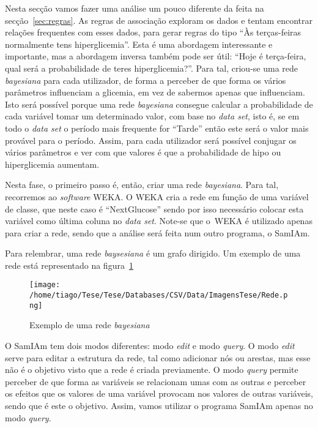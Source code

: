 Nesta secção vamos fazer uma análise um pouco diferente da feita na secção~\ref{sec:regras}. As regras de associação exploram os dados e tentam encontrar relações frequentes com esses dados, para gerar regras do tipo ``Às terças-feiras normalmente tens hiperglicemia''. Esta é uma abordagem interessante e importante, mas a abordagem inversa também pode ser útil: ``Hoje é terça-feira, qual será a probabilidade de teres hiperglicemia?''. Para tal, criou-se uma rede \textit{bayesiana} para cada utilizador, de forma a perceber de que forma os vários parâmetros influenciam a glicemia, em vez de sabermos apenas que influenciam. Isto será possível porque uma rede \textit{bayesiana} consegue calcular a probabilidade de cada variável tomar um determinado valor, com base no \textit{data set}, isto é, se em todo o \textit{data set} o período mais frequente for ``Tarde'' então este será o valor mais provável para o período. 
Assim, para cada utilizador será possível conjugar os vários parâmetros e ver com que valores é que a probabilidade de hipo ou hiperglicemia aumentam.

Nesta fase, o primeiro passo é, então, criar uma rede \textit{bayesiana}. Para tal, recorremos ao \textit{software} \ac{WEKA}. O \ac{WEKA} cria a rede em função de uma variável de classe, que neste caso é ``Next\textunderscore Glucose'' sendo por isso necessário colocar esta variável como última coluna no \textit{data set}. Note-se que o~\ac{WEKA} é utilizado apenas para criar a rede, sendo que a análise será feita num outro programa, o \ac{SamIAm}.

Para relembrar, uma rede \textit{baysesiana} é um grafo dirigido. Um exemplo de uma rede está representado na figura~\ref{fig:rede}
\begin{figure}[H]
\centering
\texttt{[image: /home/tiago/Tese/Tese/Databases/CSV/Data/ImagensTese/Rede.png]}
\caption{Exemplo de uma rede \textit{bayesiana}}
\label{fig:rede}
\end{figure}

O \ac{SamIAm} tem dois modos diferentes: modo \textit{edit} e modo \textit{query}. O modo \textit{edit} serve para editar a estrutura da rede, tal como adicionar nós ou arestas, mas esse não é o objetivo visto que a rede é criada previamente. O modo \textit{query} permite perceber de que forma as variáveis se relacionam umas com as outras e perceber os efeitos que os valores de uma variável provocam nos valores de outras variáveis, sendo que é este o objetivo. Assim, vamos utilizar o programa SamIAm apenas no modo \textit{query}.

